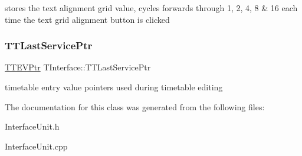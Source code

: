 stores the text alignment grid value, cycles forwards through 1, 2, 4, 8 \& 16 each time the text grid alignment button is clicked \mbox{\label{class_t_interface_aae335c69e96b9210f28225f562e50c4d}} 
\subsubsection{\texorpdfstring{T\+T\+Last\+Service\+Ptr}{TTLastServicePtr}}
{\footnotesize\ttfamily \mbox{\hyperlink{class_t_interface_abea77d791c25726e7711356bbc902534}{T\+T\+E\+V\+Ptr}} T\+Interface\+::\+T\+T\+Last\+Service\+Ptr\hspace{0.3cm}{\ttfamily [private]}}

timetable entry value pointers used during timetable editing 

The documentation for this class was generated from the following files\+:\begin{DoxyCompactItemize}
\item 
Interface\+Unit.\+h\item 
Interface\+Unit.\+cpp\end{DoxyCompactItemize}
